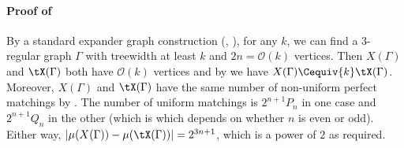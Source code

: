 \documentclass{toc}
\begin{document}
\paragraph{Proof of }
By a standard expander graph construction (\eg, \cite{Ajtai94}), for any $k$, we
can find a $3$-regular graph $\Gamma$ with treewidth at least $k$ and $2n =
\mathcal{O}(k)$ vertices. Then $X(\Gamma)$ and $\tX(\Gamma)$ both have $\mathcal{O}(k)$
vertices and by  we have $X(\Gamma) \Cequiv{k} \tX(\Gamma)$. Moreover,
$X(\Gamma)$ and $\tX(\Gamma)$ have the same number of non-uniform perfect matchings by
. The number of uniform matchings is $2^{n+1}P_n$ in
one case and $2^{n+1}Q_n$ in the other (which is which depends on whether $n$ is
even or odd). Either way, $ |\mu(X(\Gamma)) - \mu(\tX(\Gamma))| = 2^{3n+1}$, which is a
power of $2$ as required.
\end{document}
